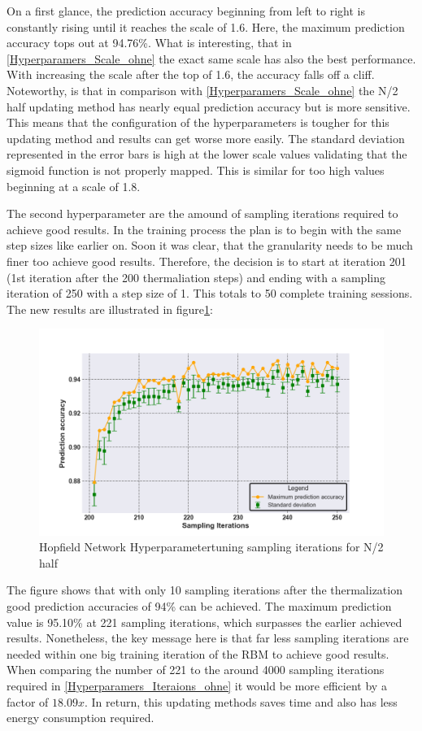 On a first glance, the prediction accuracy beginning from left to right is constantly rising until it reaches the scale of 1.6.
Here, the maximum prediction accuracy tops out at 94.76\%.
What is interesting, that in \ref{Hyperparamers_Scale_ohne} the exact same scale has also the best performance. 
With increasing the scale after the top of 1.6, the accuracy falls off a cliff. 
Noteworthy, is that in comparison with \ref{Hyperparamers_Scale_ohne} the N/2 half updating method has nearly equal prediction accuracy
but is more sensitive. 
This means that the configuration of the hyperparameters is tougher for this updating method and results can get worse more easily. 
The standard deviation represented in the error bars is high at the lower scale values validating that the sigmoid function is not properly mapped. 
This is similar for too high values beginning at a scale of 1.8.

The second hyperparameter are the amound of sampling iterations required to achieve good results. 
In the training process the plan is to begin with the same step sizes like earlier on. Soon it was clear,
that the granularity needs to be much finer too achieve good results. 
Therefore, the decision is to start at iteration 201 (1st iteration after the 200 thermaliation steps) and ending with a sampling iteration of 250 with a step size of 1.
This totals to 50 complete training sessions. The new results are illustrated in figure\ref{Hyperparamers_Iteraions_mit}:
\begin{figure}[H]
    \centering
    \includegraphics[width=0.9\linewidth]{graphics/Iterations_MIT_N2_Half_Pred_Acc.png}
    \caption{Hopfield Network Hyperparametertuning sampling iterations for N/2 half}
    \label{Hyperparamers_Iteraions_mit}
\end{figure}
The figure shows that with only 10 sampling iterations after the thermalization good prediction accuracies of 94\% can be achieved. 
The maximum prediction value is 95.10\% at 221 sampling iterations, which surpasses the earlier achieved results.
Nonetheless, the key message here is that far less sampling iterations are needed within one big training iteration of the \ac{RBM}
to achieve good results. 
When comparing the number of 221 to the around 4000 sampling iterations required in \ref{Hyperparamers_Iteraions_ohne} it would be more efficient by a factor of 
\(18.09x\). In return, this updating methods saves time and also has less energy consumption required.

